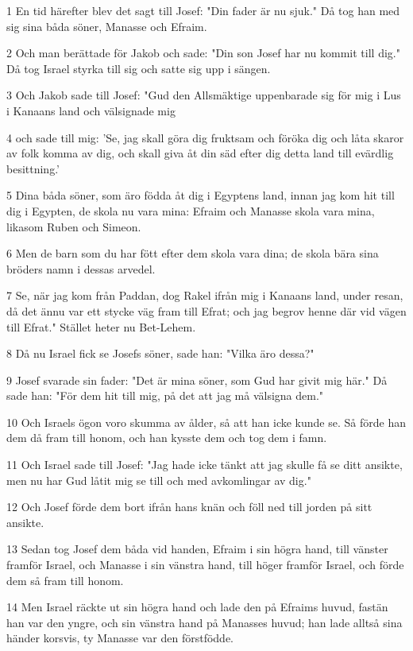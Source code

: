 \par 1 En tid härefter blev det sagt till Josef: "Din fader är nu sjuk." Då tog han med sig sina båda söner, Manasse och Efraim.
\par 2 Och man berättade för Jakob och sade: "Din son Josef har nu kommit till dig." Då tog Israel styrka till sig och satte sig upp i sängen.
\par 3 Och Jakob sade till Josef: "Gud den Allsmäktige uppenbarade sig för mig i Lus i Kanaans land och välsignade mig
\par 4 och sade till mig: 'Se, jag skall göra dig fruktsam och föröka dig och låta skaror av folk komma av dig, och skall giva åt din säd efter dig detta land till evärdlig besittning.'
\par 5 Dina båda söner, som äro födda åt dig i Egyptens land, innan jag kom hit till dig i Egypten, de skola nu vara mina: Efraim och Manasse skola vara mina, likasom Ruben och Simeon.
\par 6 Men de barn som du har fött efter dem skola vara dina; de skola bära sina bröders namn i dessas arvedel.
\par 7 Se, när jag kom från Paddan, dog Rakel ifrån mig i Kanaans land, under resan, då det ännu var ett stycke väg fram till Efrat; och jag begrov henne där vid vägen till Efrat." Stället heter nu Bet-Lehem.
\par 8 Då nu Israel fick se Josefs söner, sade han: "Vilka äro dessa?"
\par 9 Josef svarade sin fader: "Det är mina söner, som Gud har givit mig här." Då sade han: "För dem hit till mig, på det att jag må välsigna dem."
\par 10 Och Israels ögon voro skumma av ålder, så att han icke kunde se. Så förde han dem då fram till honom, och han kysste dem och tog dem i famn.
\par 11 Och Israel sade till Josef: "Jag hade icke tänkt att jag skulle få se ditt ansikte, men nu har Gud låtit mig se till och med avkomlingar av dig."
\par 12 Och Josef förde dem bort ifrån hans knän och föll ned till jorden på sitt ansikte.
\par 13 Sedan tog Josef dem båda vid handen, Efraim i sin högra hand, till vänster framför Israel, och Manasse i sin vänstra hand, till höger framför Israel, och förde dem så fram till honom.
\par 14 Men Israel räckte ut sin högra hand och lade den på Efraims huvud, fastän han var den yngre, och sin vänstra hand på Manasses huvud; han lade alltså sina händer korsvis, ty Manasse var den förstfödde.
